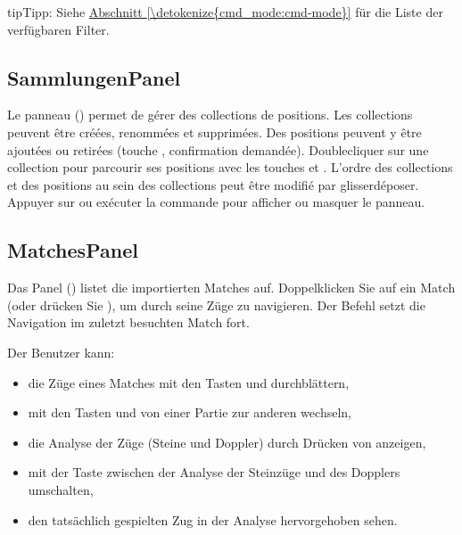 \documentclass[letterpaper,10pt,german]{sphinxmanual}
\begin{document}
\begin{sphinxadmonition}{tip}{Tipp:}
\sphinxAtStartPar
Siehe \hyperref[\detokenize{cmd_mode:cmd-mode}]{Abschnitt \ref{\detokenize{cmd_mode:cmd-mode}}} für die Liste der verfügbaren Filter.
\end{sphinxadmonition}


\subsection{Sammlungen\sphinxhyphen{}Panel}
\label{\detokenize{manuel:panneau-collections}}\label{\detokenize{manuel:id6}}
\sphinxAtStartPar
Le panneau  () permet de gérer des collections de
positions. Les collections peuvent être créées, renommées et supprimées. Des
positions peuvent y être ajoutées ou retirées (touche , confirmation
demandée). Double\sphinxhyphen{}cliquer sur une collection pour parcourir ses positions
avec les touches  et . L’ordre des collections et des
positions au sein des collections peut être modifié par glisser\sphinxhyphen{}déposer.
Appuyer sur  ou exécuter la commande  pour afficher ou
masquer le panneau.


\subsection{Matches\sphinxhyphen{}Panel}
\label{\detokenize{manuel:panneau-matchs}}\label{\detokenize{manuel:id7}}
\sphinxAtStartPar
Das Panel  () listet die importierten Matches auf. Doppelklicken Sie auf ein Match (oder drücken Sie ), um durch seine Züge zu navigieren. Der Befehl  setzt die Navigation im zuletzt besuchten Match fort.

\sphinxAtStartPar
Der Benutzer kann:
\begin{itemize}
\item {} 
\sphinxAtStartPar
die Züge eines Matches mit den Tasten  und  durchblättern,

\item {} 
\sphinxAtStartPar
mit den Tasten  und  von einer Partie zur anderen wechseln,

\item {} 
\sphinxAtStartPar
die Analyse der Züge (Steine und Doppler) durch Drücken von  anzeigen,

\item {} 
\sphinxAtStartPar
mit der Taste  zwischen der Analyse der Steinzüge und des Dopplers umschalten,

\item {} 
\sphinxAtStartPar
den tatsächlich gespielten Zug in der Analyse hervorgehoben sehen.

\end{itemize}
\end{document}
